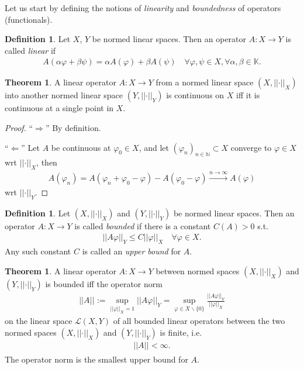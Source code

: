 \documentclass[12pt, a4paper]{article}
\numberwithin{equation}{section}
\theoremstyle{definition}
\theoremstyle{definition}
\newtheorem{defn}[thm]{Definition} %
\newtheorem{theorem}[thm]{Theorem}
\newcommand{\norm}[2]{\left\vert\left\vert #1 \right\vert\right\vert_{#2}}
\newcommand{\seq}[1][\varphi]{\left( #1 \right)_{n \in \mathbb{N}}}
\begin{document}
	Let us start by defining the notions of \textit{linearity} and \textit{boundedness} of operators (\mbox{functionals}). 
	
	\begin{defn}\label{defn:linearity_operator}
		Let $X$, $Y$ be normed linear spaces. Then an operator 
		$A:X\to Y$ is called \textit{linear} if 
		\begin{align}
			A(\alpha \varphi + \beta \psi) = \alpha A(\varphi) + \beta A(\psi) \quad \forall \varphi, \psi\in X, \forall \alpha, \beta\in \mathbb K.
		\end{align}
	\end{defn}

	\begin{theorem}
		A linear operator $A: X\to Y$ from a normed linear space $(X, \norm{\cdot}{X})$ into another normed linear space $(Y, \norm{\cdot}{Y})$ is continuous on $X$ iff it is continuous at a single point in $X$.
	\end{theorem}

	\begin{proof}
		\enquote{$\Longrightarrow$} By definition. 
		
		\enquote{$\Longleftarrow$} Let $A$ be continuous at $\varphi_0\in X$, and let $\seq[\varphi_n]\subset X$ converge to $\varphi\in X$ wrt $\norm{\cdot}{X}$, then
		\begin{align}
			A(\varphi_n) = A(\varphi_n + \varphi_0 - \varphi) - A(\varphi_0 - \varphi) \overset{n\to\infty}{\longrightarrow} A(\varphi)
		\end{align} 
		wrt $\norm{\cdot}{Y}$.
	\end{proof}
	
	\begin{defn}\label{defn:boundedness_operator}
		Let $\left(X, \norm{\cdot}{X}\right)$ and $(Y, \norm{\cdot}{Y})$ be normed linear spaces. Then an operator $A: X\to Y$ is called \textit{bounded} if there is a constant $C(A) > 0$ s.t. 
		\begin{align}
			\norm{A\varphi}{Y} \leq C \norm{\varphi}{X} \quad\forall \varphi\in X.
		\end{align}
		Any such constant $C$ is called an \textit{upper bound} for $A$.
	\end{defn}

	\begin{theorem}
		A linear operator $A: X\to Y$ between normed spaces $(X, \norm{\cdot}{X})$ and $(Y, \norm{\cdot}{Y})$ is bounded iff the operator norm
		\begin{align}
			\norm{A}{} := \sup_{\norm{\varphi}{X} = 1}\norm{A\varphi}{Y} = \sup_{\varphi\in X\backslash \{0\}}\frac{\norm{A\varphi}{Y}}{\norm{\varphi}{X}}
		\end{align}
		on the linear space $\mathcal L(X, Y)$ of all bounded linear operators between the two normed spaces $(X, \norm{\cdot}{X})$ and $(Y, \norm{\cdot}{Y})$ is finite, i.e. 
		\begin{align}
			\norm{A}{} < \infty. 
		\end{align} 
		The operator norm is the smallest upper bound for $A$.
	\end{theorem}
	
\end{document}
